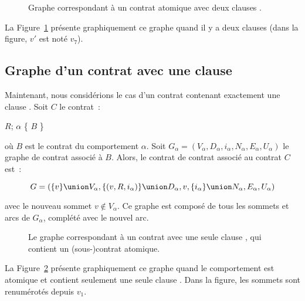 \begin{figure}


\caption{\label{figure:test:throwable_graph} Graphe correspondant à un contrat
atomique avec deux clauses \athrowable.}

\end{figure}

La Figure~\ref{figure:test:throwable_graph} présente graphiquement ce graphe
quand il y a deux clauses \athrowable (dans la figure, $v'$ est noté $v_7$).

\subsection{Graphe d'un contrat avec une clause \abehavior}
\label{subsection:test:behavior_graph}

Maintenant, nous considérions le cas d'un contrat contenant exactement une
clause \abehavior. Soit $C$ le contrat~:

\begin{pre}
\arequires \(R\);
\abehavior \(\alpha\) \{ \(B\) \}
\end{pre}

où $B$ est le contrat du comportement $\alpha$. Soit $G_\alpha = (V_\alpha,
D_\alpha, i_\alpha, N_\alpha, E_\alpha, U_\alpha)$ le graphe de contrat associé
à $B$. Alors, le contrat de contrat associé au contrat $C$ est~:

$$G = (
  \{v\} \union V_\alpha,
  \{(v, R, i_\alpha)\} \union D_\alpha,
  v,
  \{i_\alpha\} \union N_\alpha,
  E_\alpha,
  U_\alpha
)$$

avec le nouveau sommet $v \notin V_\alpha$. Ce graphe est composé de tous les
sommets et arcs de $G_\alpha$, complété avec le nouvel arc.

\begin{figure}


\caption{\label{figure:test:behavior_graph} Le graphe correspondant à un contrat
avec une seule clause \abehavior, qui contient un (sous-)contrat atomique.}

\end{figure}

La Figure~\ref{figure:test:behavior_graph} présente graphiquement ce graphe
quand le comportement est atomique et contient seulement une seule clause
\athrowable.  Dans la figure, les sommets sont renumérotés depuis $v_1$.

